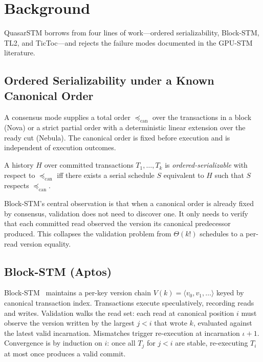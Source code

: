 \section{Background}

\label{sec:background}

QuasarSTM borrows from four lines of work---ordered serializability,
Block-STM, TL2, and TicToc---and rejects the failure modes documented in
the GPU-STM literature.

\subsection{Ordered Serializability under a Known Canonical Order}

\begin{definition}
\label{def:canonical-order}
A consensus mode supplies a total order
$\preceq_{\mathrm{can}}$ over the transactions in a block (Nova) or a
strict partial order with a deterministic linear extension over the
ready cut (Nebula). The canonical order is fixed before execution and
is independent of execution outcomes.
\end{definition}

\begin{definition}
\label{def:ordered-serializable}
A history $H$ over committed transactions $T_1,\ldots,T_k$ is
\emph{ordered-serializable} with respect to $\preceq_{\mathrm{can}}$
iff there exists a serial schedule $S$ equivalent to $H$ such that
$S$ respects $\preceq_{\mathrm{can}}$.
\end{definition}

Block-STM's central observation is that when a canonical order is
already fixed by consensus, validation does not need to discover one.
It only needs to verify that each committed read observed the version
its canonical predecessor produced. This collapses the validation
problem from $\Theta(k!)$ schedules to a per-read version equality.

\subsection{Block-STM (Aptos)}

Block-STM~\cite{gelashvili2022blockstm} maintains a per-key version
chain $V(k) = \langle v_0, v_1, \ldots\rangle$ keyed by canonical
transaction index. Transactions execute speculatively, recording reads
and writes. Validation walks the read set: each read at canonical
position $i$ must observe the version written by the largest $j < i$
that wrote $k$, evaluated against the latest valid incarnation.
Mismatches trigger re-execution at incarnation $\iota+1$. Convergence
is by induction on $i$: once all $T_j$ for $j < i$ are stable,
re-executing $T_i$ at most once produces a valid commit.

